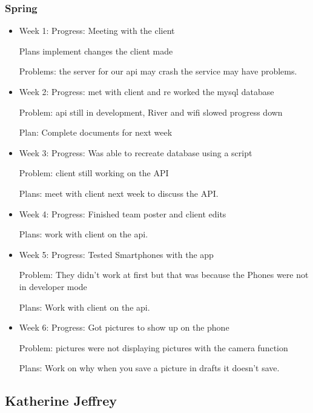 \documentclass[onecolumn, draftclsnofoot,10pt, compsoc]{IEEEtran}
\begin{document}
 \subsubsection{Spring}
 \begin{itemize}
     \item Week 1: Progress: Meeting with the client 

Plans implement changes the client made

Problems: the server for our api may crash the service may have problems.
     \item Week 2: Progress: met with client and re worked the mysql database

Problem: api still in development, River and wifi slowed progress down

Plan: Complete documents for next week
     \item Week 3: 
Progress: Was able to recreate database using a script

Problem: client still working on the API

Plans: meet with client next week to discuss the API.
     \item Week 4: Progress: Finished team poster and client edits

Plans: work with client on the api.
     \item Week 5: Progress: Tested Smartphones with the app

Problem: They didn't work at first but that was because the Phones were not in developer mode

Plans: Work with client on the api.
     \item Week 6: Progress: Got pictures to show up on the phone

Problem: pictures were not displaying pictures with the camera function

Plans: Work on why when you save a picture in drafts it doesn't save.
 \end{itemize}
 
 \subsection{Katherine Jeffrey}
\end{document}
